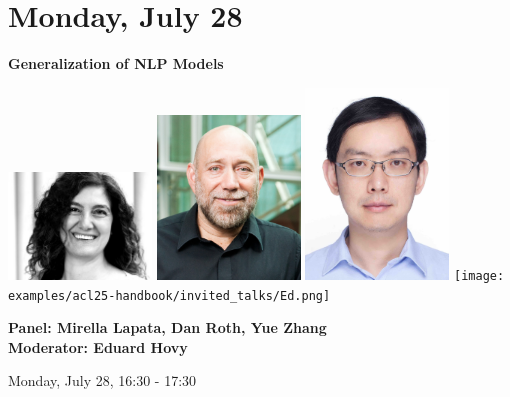 \section{Monday, July 28}


\begin{center}
    {\Large \textbf{Generalization of NLP Models}}
    
    \includegraphics[width=1.5in]{examples/acl25-handbook/invited_talks/Mirella.jpg}
    \includegraphics[width=1.5in]{examples/acl25-handbook/invited_talks/dan.jpg}
    \includegraphics[width=1.5in]{examples/acl25-handbook/invited_talks/Yue.jpg}
    \texttt{[image: examples/acl25-handbook/invited\_talks/Ed.png]}
    
    {\large \textbf{Panel: Mirella Lapata, Dan Roth, Yue Zhang}}\\
    {\large \textbf{Moderator: Eduard Hovy}}

    Monday, July 28, 16:30 - 17:30
\end{center}

